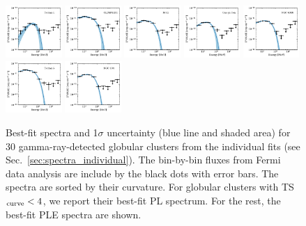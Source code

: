 \documentclass[doublespace,nopageskip]{VTthesis}
\begin{document}
\begin{appendices}
\begin{figure}
\includegraphics[width=0.19\textwidth]{Figures/Globular/spectra/PLE_spectrum_27.pdf}
\includegraphics[width=0.19\textwidth]{Figures/Globular/spectra/PLE_spectrum_1.pdf}
\includegraphics[width=0.19\textwidth]{Figures/Globular/spectra/PLE_spectrum_11.pdf}
\includegraphics[width=0.19\textwidth]{Figures/Globular/spectra/PLE_spectrum_6.pdf}
\includegraphics[width=0.19\textwidth]{Figures/Globular/spectra/PLE_spectrum_15.pdf}
\includegraphics[width=0.19\textwidth]{Figures/Globular/spectra/PLE_spectrum_29.pdf}
\includegraphics[width=0.19\textwidth]{Figures/Globular/spectra/PLE_spectrum_3.pdf}
\caption{Best-fit spectra and 1$\sigma$ uncertainty (blue line and shaded area) for 30 gamma-ray-detected globular clusters from the individual fits (see Sec.~\ref{sec:spectra_individual}). The bin-by-bin fluxes from Fermi data analysis are include by the black dots with error bars. The spectra are sorted by their curvature. For globular clusters with TS$_{\rm curve} < 4$, we report their best-fit PL spectrum. For the rest, the best-fit PLE spectra are shown.}
\label{fig:spectra}
\end{figure}


\end{appendices}
\end{document}

